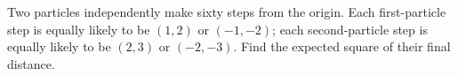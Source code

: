 Two particles independently make sixty steps from the origin. Each first-particle step is equally likely to be $(1,2)$ or $(-1,-2)$; each second-particle step is equally likely to be $(2,3)$ or $(-2,-3)$. Find the expected square of their final distance.
